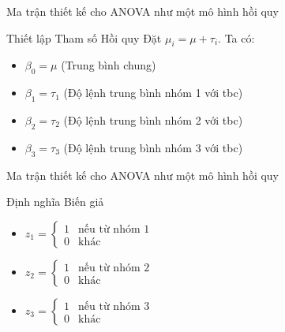 \begin{frame}{Ma trận thiết kế cho ANOVA như một mô hình hồi quy}

        \begin{block}{Thiết lập Tham số Hồi quy}
        Đặt $\mu_i = \mu + \tau_i$. Ta có:
        \begin{itemize}
            \item $\beta_0 = \mu$ (Trung bình chung)
            \item $\beta_1 = \tau_1$ (Độ lệnh trung bình nhóm 1 với tbc)
            \item $\beta_2 = \tau_2$ (Độ lệnh trung bình nhóm 2 với tbc)
            \item $\beta_3 = \tau_3$ (Độ lệnh trung bình nhóm 3 với tbc)
        \end{itemize}
    \end{block}
   
    

    

\end{frame}

\begin{frame}{Ma trận thiết kế cho ANOVA như một mô hình hồi quy}
    
 \begin{block}{Định nghĩa Biến giả}
        \begin{itemize}
            \item $z_1 = \begin{cases} 1 & \text{nếu từ nhóm 1} \\ 0 & \text{khác} \end{cases}$
            \item $z_2 = \begin{cases} 1 & \text{nếu từ nhóm 2} \\ 0 & \text{khác} \end{cases}$
            \item $z_3 = \begin{cases} 1 & \text{nếu từ nhóm 3} \\ 0 & \text{khác} \end{cases}$
        \end{itemize}
    \end{block}
\end{frame}

